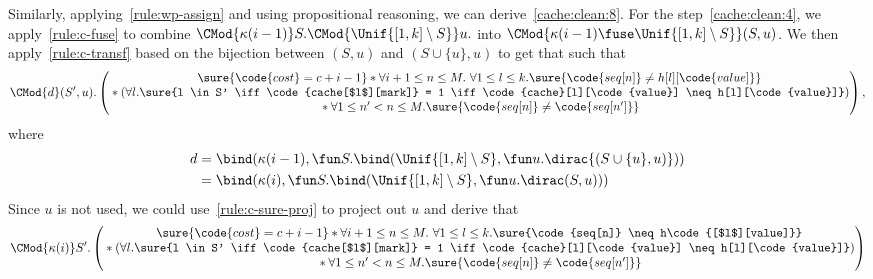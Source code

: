 \documentclass[acmsmall,nonacm,screen,appendix]{acmart}
\begin{document}
Similarly, applying~\ref{rule:wp-assign} and using propositional reasoning,
we can derive~\eqref{cache:clean:8}.
For the step~\eqref{cache:clean:4}, we apply~\ref{rule:c-fuse} to combine
$\CMod{\kappa(i - 1)} S. \CMod{\Unif{[1,k] \setminus S}} u.$ into
$\CMod{\kappa(i - 1) \fuse \Unif{[1,k] \setminus S}} (S, u)$.
We then apply~\ref{rule:c-transf} based on the bijection between
$(S, u)$ and $(S \cup \{u\}, u)$ to get that
such that
\begin{align*}
  \CMod{d} (S', u).
          \begin{pmatrix}
          \sure{\code{cost} = c + i - 1}  \ast \forall i + 1 \leq n \leq M.\  \forall 1 \leq l \leq k. \sure{\code{seq[n]} \neq h[l][\code{value]}} \\
                 {} \ast  (\forall l. \sure{l \in S' \iff \code{cache[$l$][mark]} = 1 \iff \code{cache}[l][\code{value}] \neq h[l][\code{value}]}) \\
                 {} \ast \forall 1 \leq n' < n \leq M. \sure{\code{seq[n]} \neq \code{seq[n']}}\\
          \end{pmatrix},
\end{align*}
where
\begin{align*}
  d &= \bind(\kappa(i - 1), \fun S. \bind(\Unif{[1,k] \setminus S}, \fun u. \dirac{(S \cup \{u\},  u)})) \\
    &= \bind(\kappa(i ), \fun S. \bind(\Unif{[1,k] \setminus S}, \fun u. \dirac(S ,  u)))
\end{align*}
Since $u$ is not used,
we could use~\ref{rule:c-sure-proj} to project out $u$ and
derive that
\begin{align*}
  \CMod{\kappa(i)} S'.
          \begin{pmatrix}
                 \sure{\code{cost} = c + i - 1}  \ast  \forall i + 1 \leq n \leq M.\  \forall 1 \leq l \leq k. \sure{\code{seq[n]} \neq h\code{[$l$][value]}} \\
                 {} \ast (\forall l. \sure{l \in S' \iff \code{cache[$l$][mark]} = 1 \iff \code{cache}[l][\code{value}] \neq h[l][\code{value}]}) \\
                 {} \ast \forall 1 \leq n' < n \leq M. \sure{\code{seq[n]} \neq \code{seq[n']}}\\
          \end{pmatrix}
\end{align*}
\end{document}
